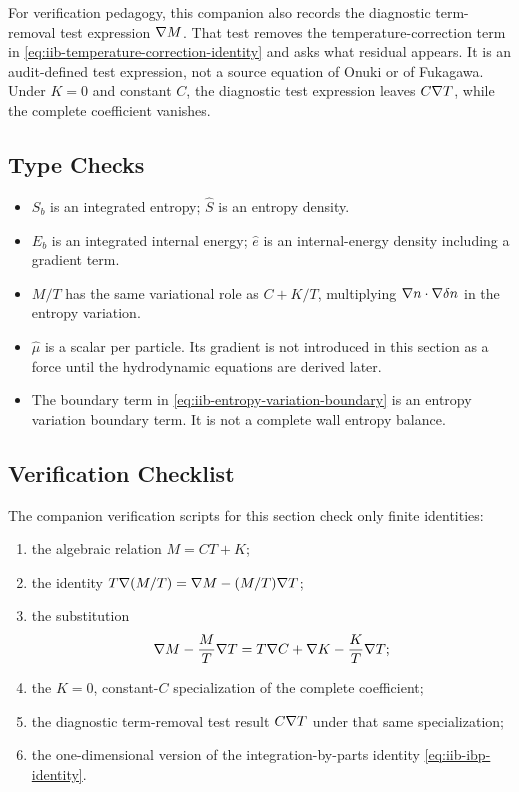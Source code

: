 For verification pedagogy, this companion also records the diagnostic
term-removal test expression \(\nabla M\).  That test removes the
temperature-correction term in \eqref{eq:iib-temperature-correction-identity}
and asks what residual appears.  It is an audit-defined test expression, not a
source equation of Onuki or of Fukagawa.  Under \(K=0\) and constant \(C\), the
diagnostic test expression leaves \(C\nabla T\), while the complete coefficient
vanishes.

\subsection{Type Checks}

\begin{itemize}
\item \(S_b\) is an integrated entropy; \(\hat S\) is an entropy density.
\item \(E_b\) is an integrated internal energy; \(\hat e\) is an
  internal-energy density including a gradient term.
\item \(M/T\) has the same variational role as \(C+K/T\), multiplying
  \(\nabla n\cdot\nabla\delta n\) in the entropy variation.
\item \(\hat\mu\) is a scalar per particle.  Its gradient is not introduced in
  this section as a force until the hydrodynamic equations are derived later.
\item The boundary term in \eqref{eq:iib-entropy-variation-boundary} is an
  entropy variation boundary term.  It is not a complete wall entropy balance.
\end{itemize}

\subsection{Verification Checklist}

The companion verification scripts for this section check only finite
identities:

\begin{enumerate}
\item the algebraic relation \(M=CT+K\);
\item the identity \(T\nabla(M/T)=\nabla M-(M/T)\nabla T\);
\item the substitution
  \[
    \nabla M-\frac{M}{T}\nabla T
    =
    T\nabla C+\nabla K-\frac{K}{T}\nabla T;
  \]
\item the \(K=0\), constant-\(C\) specialization of the complete coefficient;
\item the diagnostic term-removal test result \(C\nabla T\) under that same
  specialization;
\item the one-dimensional version of the integration-by-parts identity
  \eqref{eq:iib-ibp-identity}.
\end{enumerate}

